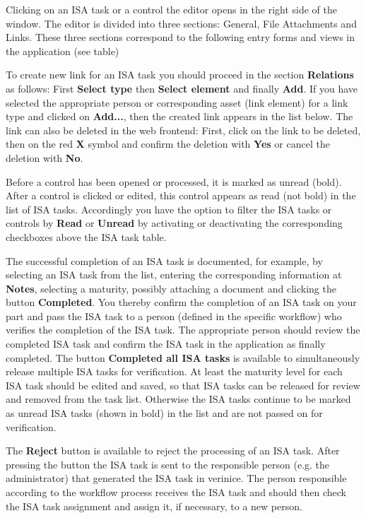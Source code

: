 \documentclass[a4paper,10pt]{book}
\begin{document}
Clicking on an ISA task or a control the editor opens in the right
side of the window. The editor is divided into three sections:
General, File Attachments and Links. These three sections correspond
to the following entry forms and views in the application (see table)

To create new link for an ISA task you should proceed in the section
\textbf{Relations} as follows: First \textbf{Select type} then
\textbf{Select element} and finally \textbf{Add}. If you have selected
the appropriate person or corresponding asset (link element) for a
link type and clicked on \textbf{Add...}, then the created link
appears in the list below. The link can also be deleted in the web
frontend: First, click on the link to be deleted, then on the red
\textbf{X} symbol and confirm the deletion with \textbf{Yes} or cancel
the deletion with \textbf{No}.

Before a control has been opened or processed, it is marked as unread
(bold). After a control is clicked or edited, this control appears as
read (not bold) in the list of ISA tasks. Accordingly you have the
option to filter the ISA tasks or controls by \textbf{Read} or
\textbf{Unread} by activating or deactivating the corresponding
checkboxes above the ISA task table.

The successful completion of an ISA task is documented, for example,
by selecting an ISA task from the list, entering the corresponding
information at \textbf{Notes}, selecting a maturity, possibly
attaching a document and clicking the button \textbf{Completed}.  You
thereby confirm the completion of an ISA task on your part and pass
the ISA task to a person (defined in the specific workflow) who
verifies the completion of the ISA task.  The appropriate person
should review the completed ISA task and confirm the ISA task in the
application as finally completed.  The button \textbf{Completed all
  ISA tasks} is available to simultaneously release multiple ISA tasks
for verification.  At least the maturity level for each ISA task
should be edited and saved, so that ISA tasks can be released for
review and removed from the task list. Otherwise the ISA tasks
continue to be marked as unread ISA tasks (shown in bold) in the list
and are not passed on for verification.

The \textbf{Reject} button is available to reject the processing of an
ISA task.  After pressing the button the ISA task is sent to the
responsible person (e.g. the administrator) that generated the ISA
task in verinice.  The person responsible according to the workflow
process receives the ISA task and should then check the ISA task
assignment and assign it, if necessary, to a new person.
\end{document}
